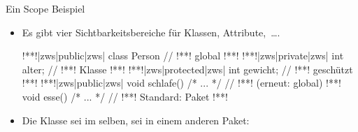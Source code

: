{\begin{frame}[fragile,c]{Ein Scope Beispiel}
   \small\begin{itemize}[<+(1)->]
      \itemsep6pt
   \item Es gibt vier Sichtbarkeitsbereiche für Klassen, Attribute,~\ldots.\vspace*{-8\baselineskip}
\begin{layout-imageonly}
\begin{plainjava}[language=xJava]
!**!|zws|public|zws| class Person { // !**! global
!**!    !**!|zws|private|zws| int alter; // !**! Klasse
!**!    !**!|zws|protected|zws| int gewicht; // !**! geschützt
!**!    !**!|zws|public|zws| void schlafe() { /* ... */ } // !**! (erneut: global)
!**!    void esse() { /* ... */ } // !**! Standard: Paket
!**!}
\end{plainjava}\vspace*{-8.66\baselineskip}
\end{layout-imageonly}
\item<8-> Die Klasse  sei im selben,  sei in einem anderen Paket: \medskip\par
{}
\end{itemize}
\end{frame}

}
